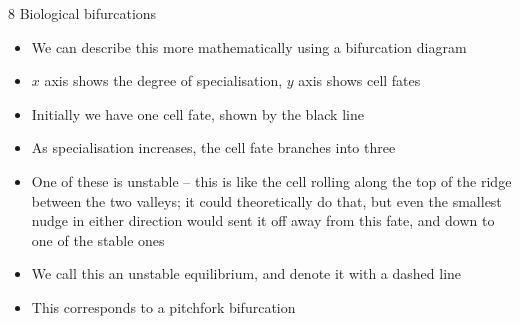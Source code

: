 \documentclass[presentation]{beamer}
\begin{document}
\begin{frame}[label={sec:org1a187cb}]{8 Biological bifurcations}
\begin{itemize}
\item We can describe this more mathematically using a bifurcation diagram
\item \(x\) axis shows the degree of specialisation, \(y\) axis shows cell fates
\item Initially we have one cell fate, shown by the black line
\item As specialisation increases, the cell fate branches into three
\item One of these is unstable -- this is like the cell rolling along the top of the ridge between the two valleys; it could theoretically do that, but even the smallest nudge in either direction would sent it off away from this fate, and down to one of the stable ones
\item We call this an unstable equilibrium, and denote it with a dashed line
\item This corresponds to a pitchfork bifurcation
\end{itemize}
\end{frame}
\end{document}
